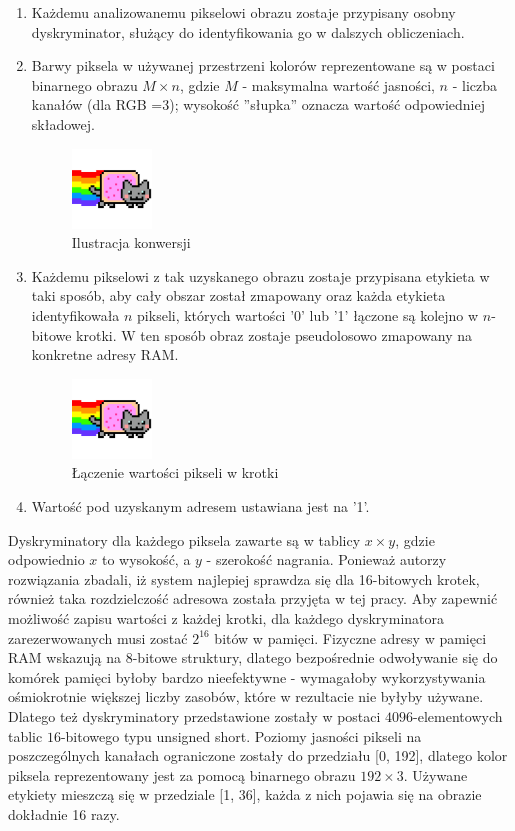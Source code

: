 \begin{enumerate}
\item Każdemu analizowanemu pikselowi obrazu zostaje przypisany osobny dyskryminator, służący do identyfikowania go w dalszych obliczeniach.
\item Barwy piksela w używanej przestrzeni kolorów reprezentowane są w postaci binarnego obrazu $M \times n$, gdzie $M$ - maksymalna wartość jasności, $n$ - liczba kanałów (dla RGB =3); wysokość ''słupka'' oznacza wartość odpowiedniej składowej.

\begin{figure}[!h]
\centering
\includegraphics[width=0.2\textwidth]{img/sample}
\caption{Ilustracja konwersji \label{fig:binPixel}}
\end{figure}

\item Każdemu pikselowi z tak uzyskanego obrazu zostaje przypisana etykieta w taki sposób, aby cały obszar został zmapowany oraz każda etykieta identyfikowała $n$ pikseli, których wartości '0' lub '1' łączone są kolejno w $n$-bitowe krotki. W ten sposób obraz zostaje pseudolosowo zmapowany na konkretne adresy RAM.

\begin{figure}[!h]
\centering
\includegraphics[width=0.2\textwidth]{img/sample}
\caption{Łączenie wartości pikseli w krotki \label{fig:map}}
\end{figure}


\item Wartość pod uzyskanym adresem ustawiana jest na '1'.
\end{enumerate}
Dyskryminatory dla każdego piksela zawarte są w tablicy $x\times y$, gdzie odpowiednio $x$ to wysokość, a $y$ - szerokość nagrania. Ponieważ autorzy rozwiązania zbadali, iż system najlepiej sprawdza się dla 16-bitowych krotek, również taka rozdzielczość adresowa została przyjęta w tej pracy. Aby zapewnić możliwość zapisu wartości z każdej krotki, dla każdego dyskryminatora zarezerwowanych musi zostać $2^16$ bitów w pamięci. Fizyczne adresy w pamięci RAM wskazują na 8-bitowe struktury, dlatego bezpośrednie odwoływanie się do komórek pamięci byłoby bardzo nieefektywne - wymagałoby wykorzystywania ośmiokrotnie większej liczby zasobów, które w rezultacie nie byłyby używane. Dlatego też dyskryminatory przedstawione zostały w postaci $4096$-elementowych tablic $16$-bitowego typu unsigned short. Poziomy jasności pikseli na poszczególnych kanałach ograniczone zostały do przedziału [0, 192], dlatego kolor piksela reprezentowany jest za pomocą binarnego obrazu $192 \times 3$. Używane etykiety mieszczą się w przedziale [1, 36], każda z nich pojawia się na obrazie dokładnie 16 razy. 
